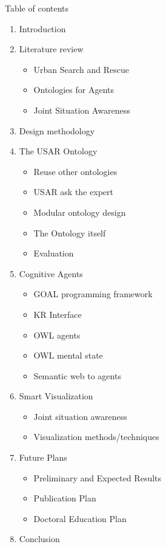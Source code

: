 Table of contents
\tableofcontents

\begin{enumerate}
\item Introduction
\item Literature review
\begin{itemize}
\item Urban Search and Rescue
\item Ontologies for Agents
\item Joint Situation Awareness
\end{itemize}
\item Design methodology
\item The USAR Ontology
\begin{itemize}
\item Reuse other ontologies
\item USAR ask the expert 
\item Modular ontology design
\item The Ontology itself
\item Evaluation
\end{itemize}

\item Cognitive Agents
\begin{itemize}
\item GOAL programming framework
\item KR Interface
\item OWL agents
\item OWL mental state
\item Semantic web to agents
\end{itemize}

\item Smart Visualization
\begin{itemize}
\item Joint situation awareness
\item Visualization methods/techniques
\end{itemize}

\item Future Plans
\begin{itemize}
\item Preliminary and Expected Results
\item Publication Plan
\item Doctoral Education Plan
\end{itemize}
\item Conclusion
\end{enumerate}
  
  
  
  
  
  
  
  
  
  